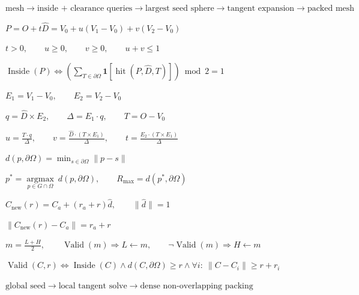 \documentclass[multi=formula,border=2pt]{standalone}
\newenvironment{formula}{\Large\begin{math}\displaystyle}{\end{math}}
\begin{document}
\begin{formula}
\text{mesh} \rightarrow \text{inside + clearance queries} \rightarrow \text{largest seed sphere} \rightarrow \text{tangent expansion} \rightarrow \text{packed mesh}
\end{formula}

\begin{formula}
P = O + t\hat D = V_0 + u(V_1-V_0) + v(V_2-V_0)
\end{formula}

\begin{formula}
t>0, \qquad u\ge0, \qquad v\ge0, \qquad u+v\le1
\end{formula}

\begin{formula}
\operatorname{Inside}(P) \iff \left(\sum_{T\in\partial\Omega}\mathbf{1}[\operatorname{hit}(P,\hat D,T)]\right) \bmod 2 = 1
\end{formula}

\begin{formula}
E_1=V_1-V_0, \qquad E_2=V_2-V_0
\end{formula}

\begin{formula}
q=\hat D\times E_2, \qquad \Delta=E_1\cdot q, \qquad T=O-V_0
\end{formula}

\begin{formula}
u=\frac{T\cdot q}{\Delta}, \qquad v=\frac{\hat D\cdot(T\times E_1)}{\Delta}, \qquad t=\frac{E_2\cdot(T\times E_1)}{\Delta}
\end{formula}

\begin{formula}
d(p,\partial\Omega)=\min_{s\in\partial\Omega}\lVert p-s\rVert
\end{formula}

\begin{formula}
p^*=\underset{p\in G\cap\Omega}{\operatorname{argmax}}\ d(p,\partial\Omega), \qquad R_{\max}=d(p^*,\partial\Omega)
\end{formula}

\begin{formula}
C_{\mathrm{new}}(r)=C_a+(r_a+r)\hat d, \qquad \lVert\hat d\rVert=1
\end{formula}

\begin{formula}
\lVert C_{\mathrm{new}}(r)-C_a\rVert=r_a+r
\end{formula}

\begin{formula}
m=\frac{L+H}{2}, \qquad \operatorname{Valid}(m)\Rightarrow L\leftarrow m, \qquad \neg\operatorname{Valid}(m)\Rightarrow H\leftarrow m
\end{formula}

\begin{formula}
\operatorname{Valid}(C,r) \iff \operatorname{Inside}(C) \land d(C,\partial\Omega)\ge r \land \forall i:\ \lVert C-C_i\rVert\ge r+r_i
\end{formula}

\begin{formula}
\text{global seed} \rightarrow \text{local tangent solve} \rightarrow \text{dense non-overlapping packing}
\end{formula}
\end{document}
